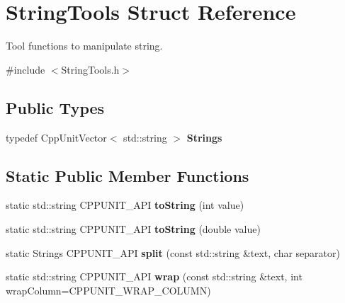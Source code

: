 \hypertarget{struct_string_tools}{}\section{String\+Tools Struct Reference}
\label{struct_string_tools}


Tool functions to manipulate string.  




{\ttfamily \#include $<$String\+Tools.\+h$>$}

\subsection*{Public Types}
\begin{DoxyCompactItemize}
\item 
typedef Cpp\+Unit\+Vector$<$ std\+::string $>$ {\bfseries Strings}\hypertarget{struct_string_tools_ab01d065d80c39015955e9f765cd19921}{}\label{struct_string_tools_ab01d065d80c39015955e9f765cd19921}

\end{DoxyCompactItemize}
\subsection*{Static Public Member Functions}
\begin{DoxyCompactItemize}
\item 
static std\+::string C\+P\+P\+U\+N\+I\+T\+\_\+\+A\+PI {\bfseries to\+String} (int value)\hypertarget{struct_string_tools_a2b4a4cbbfa69a2c28c71bd519ba71e5c}{}\label{struct_string_tools_a2b4a4cbbfa69a2c28c71bd519ba71e5c}

\item 
static std\+::string C\+P\+P\+U\+N\+I\+T\+\_\+\+A\+PI {\bfseries to\+String} (double value)\hypertarget{struct_string_tools_adfab22bf90b73231f635aa1ae299d4c4}{}\label{struct_string_tools_adfab22bf90b73231f635aa1ae299d4c4}

\item 
static Strings C\+P\+P\+U\+N\+I\+T\+\_\+\+A\+PI {\bfseries split} (const std\+::string \&text, char separator)\hypertarget{struct_string_tools_ac3c3d30a35c82c1d5fcb54e915130767}{}\label{struct_string_tools_ac3c3d30a35c82c1d5fcb54e915130767}

\item 
static std\+::string C\+P\+P\+U\+N\+I\+T\+\_\+\+A\+PI {\bfseries wrap} (const std\+::string \&text, int wrap\+Column=C\+P\+P\+U\+N\+I\+T\+\_\+\+W\+R\+A\+P\+\_\+\+C\+O\+L\+U\+MN)\hypertarget{struct_string_tools_a02d43819e61394264c3e75c24433a057}{}\label{struct_string_tools_a02d43819e61394264c3e75c24433a057}

\end{DoxyCompactItemize}


